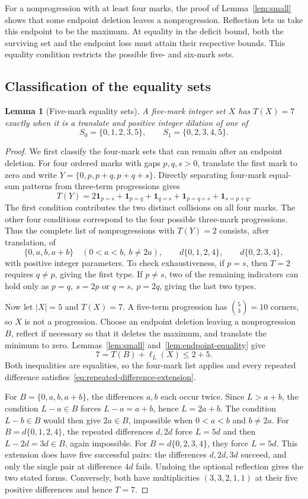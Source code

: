 \documentclass[11pt,a4paper]{article}
\newtheorem{lemma}[theorem]{Lemma}
\theoremstyle{definition}
\newcommand{\ind}{\mathbf1}
\numberwithin{equation}{section}
\begin{document}
For a nonprogression with at least four marks, the proof of Lemma~\ref{lem:small}
shows that some endpoint deletion leaves a nonprogression. Reflection lets us
take this endpoint to be the maximum. At equality in the deficit bound, both
the surviving set and the endpoint loss must attain their respective bounds.
This equality condition restricts the possible five- and six-mark sets.

\subsection{Classification of the equality sets}
\begin{lemma}[Five-mark equality sets]\label{lem:five-mark-equality}
A five-mark integer set $X$ has $T(X)=7$ exactly when it is a translate and
positive integer dilation of one of
\[
S_0=\{0,1,2,3,5\},\qquad S_1=\{0,2,3,4,5\}.
\]
\end{lemma}
\begin{proof}
We first classify the four-mark sets that can remain after an endpoint deletion.
For four ordered marks with gaps $p,q,s>0$, translate the first mark to zero and write
$Y=\{0,p,p+q,p+q+s\}$. Directly separating four-mark equal-sum patterns from three-term progressions gives
\[
T(Y)=2\ind_{p=s}+\ind_{p=q}+\ind_{q=s}
+\ind_{p=q+s}+\ind_{s=p+q}.
\]
The first condition contributes the two distinct collisions on all four marks. The other four conditions correspond to the four possible three-mark progressions. Thus the complete list of nonprogressions with $T(Y)=2$ consists, after translation, of
\[
\{0,a,b,a+b\}\quad(0<a<b,\ b\ne2a),
\qquad d\{0,1,2,4\},\qquad d\{0,2,3,4\},
\]
with positive integer parameters. To check exhaustiveness, if $p=s$, then $T=2$ requires $q\ne p$, giving the first type. If $p\ne s$, two of the remaining indicators can hold only as $p=q,\ s=2p$ or $q=s,\ p=2q$, giving the last two types.

Now let $|X|=5$ and $T(X)=7$. A five-term progression has $\binom53=10$ corners, so $X$ is not a progression. Choose an endpoint deletion leaving a nonprogression $B$, reflect if necessary so that it deletes the maximum, and translate the minimum to zero. Lemmas~\ref{lem:small} and~\ref{lem:endpoint-equality} give
\[
7=T(B)+\ell_L(X)\le2+5.
\]
Both inequalities are equalities, so the four-mark list applies and every repeated difference satisfies~\eqref{eq:repeated-difference-extension}.

For $B=\{0,a,b,a+b\}$, the differences $a,b$ each occur twice. Since $L>a+b$, the condition $L-a\in B$ forces $L-a=a+b$, hence $L=2a+b$. The condition $L-b\in B$ would then give $2a\in B$, impossible when $0<a<b$ and $b\ne2a$.
For $B=d\{0,1,2,4\}$, the repeated differences $d,2d$ force $L=5d$ and then $L-2d=3d\in B$, again impossible.
For $B=d\{0,2,3,4\}$, they force $L=5d$. This extension does have five successful pairs: the differences $d,2d,3d$ succeed, and only the single pair at difference $4d$ fails. Undoing the optional reflection gives the two stated forms.
Conversely, both have multiplicities $(3,3,2,1,1)$ at their five positive differences and hence $T=7$.

\end{proof}
\end{document}
